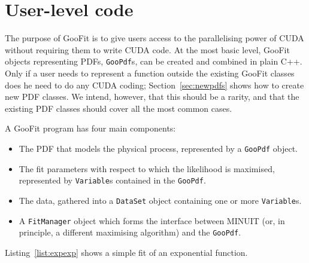 \section{User-level code}
\label{sec:usercode}

The purpose of GooFit is to give users access to the parallelising power of CUDA
without requiring them to write CUDA code. At the most basic level, GooFit objects
representing PDFs, \texttt{GooPdf}s, can be created and combined in plain C++. Only
if a user needs to represent a function outside the existing GooFit classes does he
need to do any CUDA coding; Section~\ref{sec:newpdfs} shows how to create new PDF classes.
We intend, however, that this should be a rarity, and that the existing PDF classes
should cover all the most common cases. 

A GooFit program has four main components: 
\begin{itemize}
\item The PDF that models the physical process, represented by a \texttt{GooPdf} object.
\item The fit parameters with respect to which the likelihood is maximised,
represented by \texttt{Variable}s contained in the \texttt{GooPdf}. 
\item The data, gathered into a \texttt{DataSet} object containing one or more \texttt{Variable}s.
\item A \texttt{FitManager} object which forms the interface between MINUIT
(or, in principle, a different maximising algorithm) and the \texttt{GooPdf}.
\end{itemize}
Listing~\ref{list:expexp} shows a simple fit of an exponential function.


